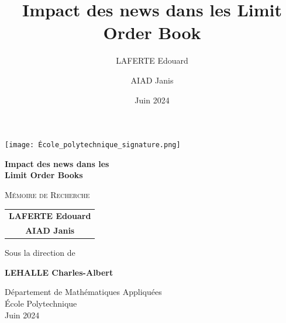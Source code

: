 \documentclass[12pt,a4paper]{article}
\title{\huge\textbf{Impact des news dans les Limit Order Book}}
\author{LAFERTE Edouard \and AIAD Janis}
\date{Juin 2024}
\theoremstyle{definition}
\theoremstyle{remark}
\begin{document}
    \begin{titlepage}
        \begin{center}
            \vspace*{2cm}
            
            \texttt{[image: École\_polytechnique\_signature.png]}
            

            
            {\huge\bfseries Impact des news dans les\\[0.4cm] 
            Limit Order Books\par}
            
            \vspace{2cm}
            
            {\Large\textsc{Mémoire de Recherche}\par}
            \vspace{1cm}
            
            {\large
            \begin{tabular}{c}
                \textbf{LAFERTE Edouard}\\[0.2cm]
                \textbf{AIAD Janis}
            \end{tabular}\par}
            
            \vspace{1.5cm}
            
            {\large Sous la direction de\par}
            \vspace{0.4cm}
            {\large\textbf{LEHALLE Charles-Albert}\par}
            
            \vfill
            
            {\large Département de Mathématiques Appliquées\\
            École Polytechnique\\[0.4cm]
            Juin 2024\par}
        \end{center}
    \end{titlepage}

    \newpage
    \null
    \thispagestyle{empty}
    \newpage
\end{document}
